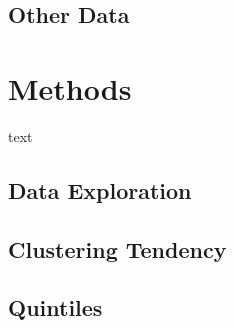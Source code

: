 \documentclass[11pt, a4paper]{article}
\begin{document}
\subsection{Other Data}
























\pagebreak 
\section{Methods}



text






\subsection{Data Exploration}
















\subsection{Clustering Tendency}













\subsection{Quintiles}
\end{document}
